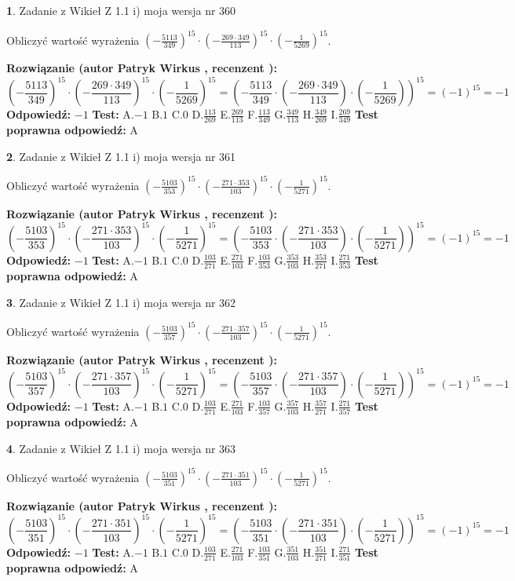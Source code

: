 \documentclass[12pt, a4paper]{article}
\theoremstyle{definition} %
\newtheorem{zad}{}
\newcommand{\zadStart}[1]{\begin{zad}#1\newline}
\newcommand{\zadStop}{\end{zad}}
\newcommand{\rozwStart}[2]{\noindent \textbf{Rozwiązanie (autor #1 , recenzent #2): }\newline}
\newcommand{\rozwStop}{\newline}
\newcommand{\odpStart}{\noindent \textbf{Odpowiedź:}\newline}
\newcommand{\odpStop}{\newline}
\newcommand{\testStart}{\noindent \textbf{Test:}\newline}
\newcommand{\testStop}{\newline}
\newcommand{\kluczStart}{\noindent \textbf{Test poprawna odpowiedź:}\newline}
\newcommand{\kluczStop}{\newline}
\begin{document}
\zadStart{Zadanie z Wikieł Z 1.1 i) moja wersja nr 360}

Obliczyć wartość wyrażenia $(-\frac{5113}{349})^{15} \cdot (-\frac{269 \cdot 349}{113})^{15} \cdot (-\frac{1}{5269})^{15}$.
\zadStop
\rozwStart{Patryk Wirkus}{}
$$(-\frac{5113}{349})^{15} \cdot (-\frac{269 \cdot 349}{113})^{15} \cdot (-\frac{1}{5269})^{15} = (-\frac{5113}{349} \cdot (-\frac{269 \cdot 349}{113}) \cdot (-\frac{1}{5269}))^{15} = (-1)^{15} = -1$$
\rozwStop
\odpStart
$-1$
\odpStop
\testStart
A.$-1$ B.$1$ C.$0$ D.$\frac{113}{269}$ E.$\frac{269}{113}$
F.$\frac{113}{349}$ G.$\frac{349}{113}$
H.$\frac{349}{269}$
I.$\frac{269}{349}$
\testStop
\kluczStart
A
\kluczStop



\zadStart{Zadanie z Wikieł Z 1.1 i) moja wersja nr 361}

Obliczyć wartość wyrażenia $(-\frac{5103}{353})^{15} \cdot (-\frac{271 \cdot 353}{103})^{15} \cdot (-\frac{1}{5271})^{15}$.
\zadStop
\rozwStart{Patryk Wirkus}{}
$$(-\frac{5103}{353})^{15} \cdot (-\frac{271 \cdot 353}{103})^{15} \cdot (-\frac{1}{5271})^{15} = (-\frac{5103}{353} \cdot (-\frac{271 \cdot 353}{103}) \cdot (-\frac{1}{5271}))^{15} = (-1)^{15} = -1$$
\rozwStop
\odpStart
$-1$
\odpStop
\testStart
A.$-1$ B.$1$ C.$0$ D.$\frac{103}{271}$ E.$\frac{271}{103}$
F.$\frac{103}{353}$ G.$\frac{353}{103}$
H.$\frac{353}{271}$
I.$\frac{271}{353}$
\testStop
\kluczStart
A
\kluczStop



\zadStart{Zadanie z Wikieł Z 1.1 i) moja wersja nr 362}

Obliczyć wartość wyrażenia $(-\frac{5103}{357})^{15} \cdot (-\frac{271 \cdot 357}{103})^{15} \cdot (-\frac{1}{5271})^{15}$.
\zadStop
\rozwStart{Patryk Wirkus}{}
$$(-\frac{5103}{357})^{15} \cdot (-\frac{271 \cdot 357}{103})^{15} \cdot (-\frac{1}{5271})^{15} = (-\frac{5103}{357} \cdot (-\frac{271 \cdot 357}{103}) \cdot (-\frac{1}{5271}))^{15} = (-1)^{15} = -1$$
\rozwStop
\odpStart
$-1$
\odpStop
\testStart
A.$-1$ B.$1$ C.$0$ D.$\frac{103}{271}$ E.$\frac{271}{103}$
F.$\frac{103}{357}$ G.$\frac{357}{103}$
H.$\frac{357}{271}$
I.$\frac{271}{357}$
\testStop
\kluczStart
A
\kluczStop



\zadStart{Zadanie z Wikieł Z 1.1 i) moja wersja nr 363}

Obliczyć wartość wyrażenia $(-\frac{5103}{351})^{15} \cdot (-\frac{271 \cdot 351}{103})^{15} \cdot (-\frac{1}{5271})^{15}$.
\zadStop
\rozwStart{Patryk Wirkus}{}
$$(-\frac{5103}{351})^{15} \cdot (-\frac{271 \cdot 351}{103})^{15} \cdot (-\frac{1}{5271})^{15} = (-\frac{5103}{351} \cdot (-\frac{271 \cdot 351}{103}) \cdot (-\frac{1}{5271}))^{15} = (-1)^{15} = -1$$
\rozwStop
\odpStart
$-1$
\odpStop
\testStart
A.$-1$ B.$1$ C.$0$ D.$\frac{103}{271}$ E.$\frac{271}{103}$
F.$\frac{103}{351}$ G.$\frac{351}{103}$
H.$\frac{351}{271}$
I.$\frac{271}{351}$
\testStop
\kluczStart
A
\kluczStop
\end{document}
